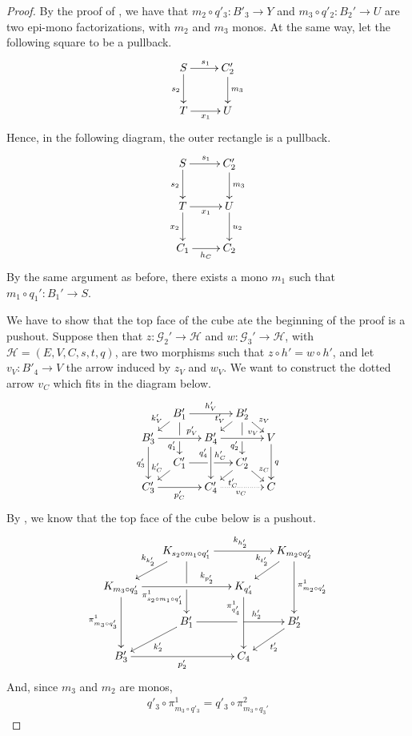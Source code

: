 \begin{proof}
	By the proof of , we have that $m_2 \circ q'_3 : B'_3 \to Y$ and $m_3 \circ q'_2 : B_2' \to U$ are two epi-mono factorizations, with $m_2$ and $m_3$ monos.
	At the same way, let the following square to be a pullback.
	\[\xymatrix{S\ar[r]^{s_1}\ar[d]_{s_2}&C'_2\ar[d]^{m_3}\\T\ar[r]_{x_1}&U}\]
	Hence, in the following diagram, the outer rectangle is a pullback.
	\[\xymatrix{
			S\ar[r]^{s_1}\ar[d]_{s_2}&C'_2\ar[d]^{m_3}\\T\ar[r]_{x_1}\ar[d]_{x_2}&U\ar[d]^{u_2}\\C_1\ar[r]_{h_C}&C_2
	}\]
	By the same argument as before, there exists a mono $m_1$ such that $m_1\circ q_1' : B_1' \to S$.

	We have to show that the top face of the cube ate the beginning of the proof is a pushout.
	Suppose then that $z: \mathcal{G}_2' \to \mathcal{H}$ and $w: \mathcal{G}_3' \to \mathcal{H}$, with $\mathcal{H} = (E, V, C, s, t, q)$,
	are two morphisms such that $z \circ h' = w \circ h'$, and let $v_V: B'_4 \to V$ the arrow induced by $z_V$ and $w_V$.
	We want to construct the dotted arrow $v_C$ which fits in the diagram below.
	\[
	\xymatrix@C=10pt@R=6pt{
		&B_1'\ar[dd]|\hole_(.65){q_1'}\ar[rr]^{h_V'} \ar[dl]_{k_V'} && B_2' \ar[dd]|\hole_(.65){q_2'} \ar[dl]_{t_V'}\ar[dr]^{z_V}\\
		B_3'  \ar[dd]_{q_3'}\ar[rr]^(.7){p_V'} & & B_4' \ar[dd]_(.3){q_4'} \ar[rr]^(.7){v_V}&&  V\ar[dd]^{q}\\
						       &C_1'\ar[rr]|\hole^(.65){h_C'} \ar[dl]_{k_C'} && C_2' \ar[dl]^{t_C'}\ar[dr]^{z_C}\\
		C'_3 \ar[rr]_{p_C'} & & C'_4\ar@{.>}[rr]_{v_C} && C
	}\]
	By {\color{red}{cite: Lemma: kernel pairs pushout M-adh cats}}, we know that the top face of the cube below is a pushout.
\[\xymatrix@C=15pt@R=15pt{&K_{s_2\circ m_1\circ q'_1}\ar[dd]|\hole_(.65){\pi_{s_2\circ m_1\circ q'_1}^{1}}\ar[rr]^{k_{h'_2}} \ar[dl]_{k_{k'_2}} && K_{m_2\circ q'_2} \ar[dd]^{\pi_{m_2\circ q'_2}^{1}} \ar[dl]_{k_{t'_2}} \\ K_{m_3\circ q'_3}  \ar[dd]_{\pi_{m_3\circ q'_3}^{1}}\ar[rr]^(.7){k_{p'_2}} & & K_{q'_4} \ar[dd]_(.3){\pi_{q'_4}^{1}}\\&B'_1\ar[rr]|\hole^(.65){h'_2} \ar[dl]^{k'_2} && B'_2 \ar[dl]^{t'_2} \\B'_3 \ar[rr]_{p'_2} & & C_4}\]
	And, since $m_3$ and $m_2$ are monos,
	\[\begin{split}
		q'_3 \circ \pi_{m_3 \circ q'_3}^1 = q'_3 \circ \pi_{m_3\circ q_3'}^2

\end{split}\]
\end{proof}
